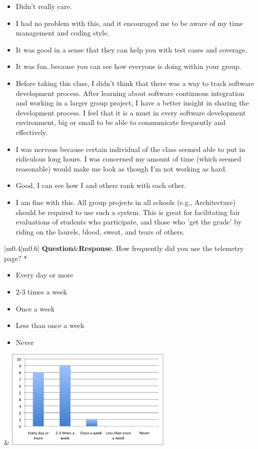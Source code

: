 \documentclass[11pt]{article}
\begin{document}
\begin{itemize}
\item Didn't really care.
\item I had no problem with this, and it encouraged me to be aware of my time management and coding style.
\item It was good in a sense that they can help you with test cases and coverage.
\item It was fun..because you can see how everyone is doing within your group.
\item Before taking this class, I didn't think that there was a way to track software development process. After learning about software continuous integration and working in a larger group project, I have a better insight in sharing the development process. I feel that it is a must in every software development environment, big or small to be able to communicate frequently and effectively. 
\item I was nervous because certain individual of the class seemed able to put in ridiculous long hours.  I was concerned my amount of time (which seemed reasonable) would make me look as though I'm not working as hard. 
\item Good, I can see how I and others rank with each other.
\item I am fine with this.  All group projects in all schools (e.g., Architecture) should be required to use such a system.  This is great for facilitating fair evaluations of students who participate, and those who 'get the grade' by riding on the laurels, blood, sweat, and tears of others.
\end{itemize}

\begin{center}
\footnotesize
\begin{longtable}{|m{}|m{}|}
\hline 
{\bf Question}&{\bf Response}\endhead {}. How frequently did you use the telemetry page? *
\begin{itemize}
\item Every day or more
\item 2-3 times a week
\item Once a week
\item Less than once a week
\item Never
\end{itemize}
&
\label{Q9}
\includegraphics[width=0.6\textwidth]{Q09-telemetryFrequence} \\ \hline

\end{longtable}
\end{center}
\end{document}
